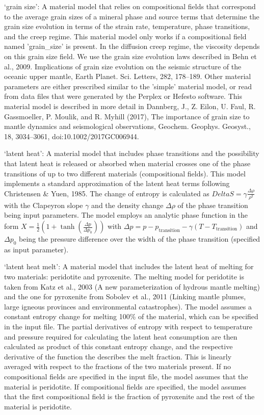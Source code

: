 \begin{itemize}
`grain size': A material model that relies on compositional fields that correspond to the average grain sizes of a mineral phase and source terms that determine the grain size evolution in terms of the strain rate, temperature, phase transitions, and the creep regime. This material model only works if a compositional field named 'grain\_size' is present. In the diffusion creep regime, the viscosity depends on this grain size field. We use the grain size evolution laws described in Behn et al., 2009. Implications of grain size evolution on the seismic structure of the oceanic upper mantle, Earth Planet. Sci. Letters, 282, 178–189. Other material parameters are either prescribed similar to the 'simple' material model, or read from data files that were generated by the Perplex or Hefesto software. This material model is described in more detail in Dannberg, J., Z. Eilon, U. Faul, R. Gassmoeller, P. Moulik, and R. Myhill (2017), The importance of grain size to mantle dynamics and seismological observations, Geochem. Geophys. Geosyst., 18, 3034–3061, doi:10.1002/2017GC006944.

`latent heat': A material model that includes phase transitions and the possibility that latent heat is released or absorbed when material crosses one of the phase transitions of up to two different materials (compositional fields). This model implements a standard approximation of the latent heat terms following Christensen \& Yuen, 1985. The change of entropy is calculated as $Delta S = \gamma \frac{\Delta\rho}{\rho^2}$ with the Clapeyron slope $\gamma$ and the density change $\Delta\rho$ of the phase transition being input parameters. The model employs an analytic phase function in the form $X=\frac{1}{2} \left( 1 + \tanh \left( \frac{\Delta p}{\Delta p_0} \right) \right)$ with $\Delta p = p - p_{\text{transition}} - \gamma \left( T - T_{\text{transition}} \right)$ and $\Delta p_0$ being the pressure difference over the width of the phase transition (specified as input parameter).

`latent heat melt': A material model that includes the latent heat of melting for two materials: peridotite and pyroxenite. The melting model for peridotite is taken from Katz et al., 2003 (A new parameterization of hydrous mantle melting) and the one for pyroxenite from Sobolev et al., 2011 (Linking mantle plumes, large igneous provinces and environmental catastrophes). The model assumes a constant entropy change for melting 100\% of the material, which can be specified in the input file. The partial derivatives of entropy with respect to temperature and pressure required for calculating the latent heat consumption are then calculated as product of this constant entropy change, and the respective derivative of the function the describes the melt fraction. This is linearly averaged with respect to the fractions of the two materials present. If no compositional fields are specified in the input file, the model assumes that the material is peridotite. If compositional fields are specified, the model assumes that the first compositional field is the fraction of pyroxenite and the rest of the material is peridotite. 


\end{itemize}
